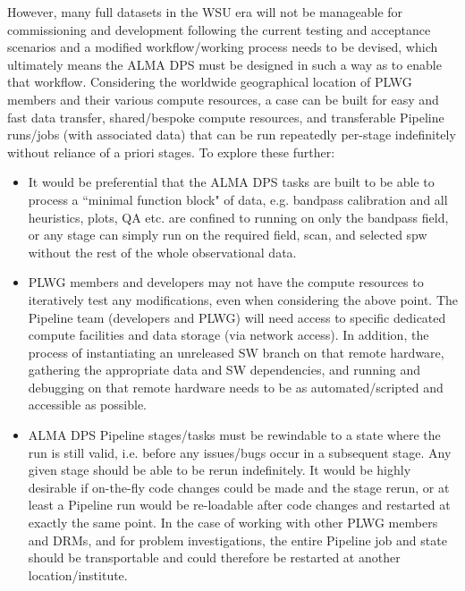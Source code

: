 However, many full datasets in the WSU era will not be manageable for commissioning and development following the current testing and acceptance scenarios and a modified workflow/working process needs to be devised, which ultimately means the ALMA DPS must be designed in such a way as to enable that workflow. Considering the worldwide geographical location of PLWG members and their various compute resources, a case can be built for easy and fast data transfer, shared/bespoke compute resources, and transferable Pipeline runs/jobs (with associated data) that can be run repeatedly per-stage indefinitely without reliance of a priori stages. To explore these further:
\begin{itemize}
    \item It would be preferential that the ALMA DPS tasks are built to be able to process a ``minimal function block" of data, e.g. bandpass calibration and all heuristics, plots, QA etc. are confined to running on only the bandpass field, or any stage can simply run on the required field, scan, and selected spw without the rest of the whole observational data. 
    \item PLWG members and developers may not have the compute resources to iteratively test any modifications, even when considering the above point. The Pipeline team (developers and PLWG) will need access to specific dedicated compute facilities and data storage (via network access).  In addition, the process of instantiating an unreleased SW branch on that remote hardware, gathering the appropriate data and SW dependencies, and running and debugging on that remote hardware needs to be as automated/scripted and accessible as possible.
    \item ALMA DPS Pipeline stages/tasks must  be rewindable to a state where the run is still valid, i.e. before any issues/bugs occur in a subsequent stage. Any given stage should be able to be rerun indefinitely. It would be highly desirable if on-the-fly code changes could be made and the stage rerun, or at least a Pipeline run would be re-loadable after code changes and restarted at exactly the same point. In the case of working with other PLWG members and DRMs, and for problem investigations, the entire Pipeline job and state should be transportable and could therefore be restarted at another location/institute.  
\end{itemize}

\newpage

